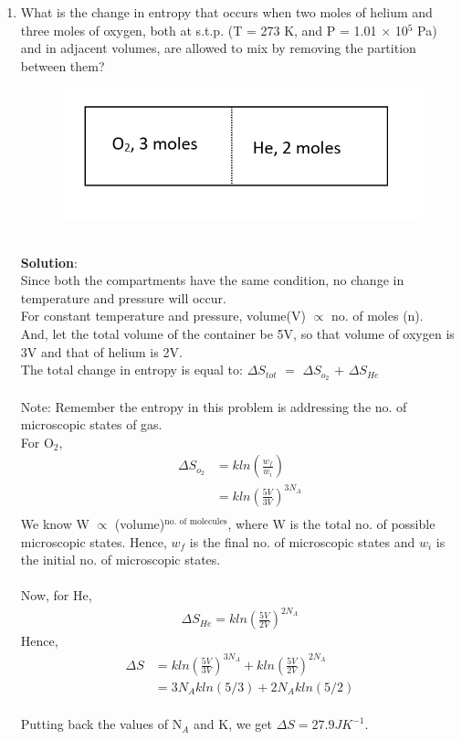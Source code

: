 \begin{enumerate}
\item What is the change in entropy that occurs when two moles of helium and three moles of oxygen, both at s.t.p. (T = 273 K, and P = 1.01 $\times$ 10$^5$ Pa) and in adjacent volumes, are allowed to mix by removing the partition between them? \\
\begin{figure}[htp]
    \centering
    \includegraphics{mainmatter/thermo3.2.PNG}
    \caption{}
    \label{fig:thermo3.2}
\end{figure}
\\
\textbf{Solution}:\\
Since both the compartments have the same condition, no change in temperature and pressure will occur. \\
For constant temperature and pressure, volume(V) $\propto$ no. of moles (n).\\ 
And, let the total volume of the container be 5V, so that volume of oxygen is 3V and that of helium is 2V. \\
The total change in entropy is equal to:
$\Delta S_{tot}$ $=$ $\Delta$$S_{o_2}$ $+$ $\Delta S_{He}$\\\\
Note: Remember the entropy in this problem is addressing the no. of microscopic states of gas.\\
For O$_2$, \\
\begin{align*}
    \Delta S_{o_2}
    &= kln\left(\frac{w_f}{w_i}\right)\\
    &= kln\left(\frac{5V}{3V}\right)^{3N_A}\\
\end{align*}
We know W $\propto$ (volume)$^\text{no. of molecules}$, where W is the total no. of possible microscopic states. Hence, $w_f$ is the final no. of microscopic states and $w_i$ is the initial no. of microscopic states.\\\\
Now, for He, \\
\begin{align*}
    \Delta S_{He} = kln\left(\frac{5V}{2V}\right)^{2N_A}
\end{align*}
Hence, 
\begin{align*}
    \Delta S &= kln\left(\frac{5V}{3V}\right)^{3N_A} + kln\left(\frac{5V}{2V}\right)^{2N_A}\\
    &=  3N_A k ln(5/3) + 2N_A k ln(5/2)
\end{align*}\\
Putting back the values of N$_A$ and K, we get $\Delta S = 27.9 JK^{-1}$. 


\end{enumerate}
